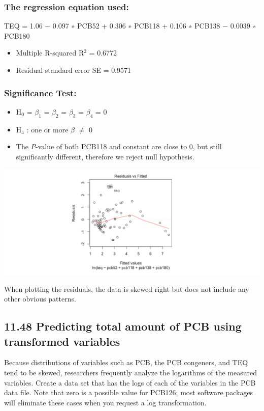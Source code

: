 \documentclass[11pt]{article}
\begin{document}
\subsubsection*{The regression equation used:}
\label{sec:org1310cbb}
TEQ = 1.06 − 0.097 ∗ PCB52 + 0.306 ∗ PCB118 + 0.106 ∗ PCB138 − 0.0039 ∗ PCB180
\begin{itemize}
\item Multiple R-squared R\(^{\text{2}}\) = 0.6772
\item Residual standard error SE = 0.9571
\end{itemize}

\subsubsection*{Significance Test:}
\label{sec:org0995582}
\begin{itemize}
\item H\(_{\text{0}}\) = \(\beta_{\text{1}}\) = \(\beta_{\text{2}}\) = \(\beta_{\text{3}}\) = \(\beta_{\text{4}}\) = 0
\item H\(_{\text{a}}\) : one or more \(\beta\) \(\neq\) 0
\item The \emph{P}-value of both PCB118 and constant are close to 0, but still significantly different, therefore we reject null hypothesis.
\end{itemize}

\begin{center}
\includegraphics[width=.9\linewidth]{./graphs/image7.png}
\end{center}
When plotting the residuals, the data is skewed right but does not include any other obvious patterns. 

\subsection*{11.48 Predicting total amount of PCB using transformed variables}
\label{sec:org5390d6e}
Because distributions of variables such as PCB, the PCB congeners, and TEQ tend to be skewed, researchers frequently analyze the logarithms of the measured variables. Create a data set that has the logs of each of the variables in the PCB data file. Note that zero is a possible value for PCB126; most software packages will eliminate these cases when you request a log transformation.
\end{document}
